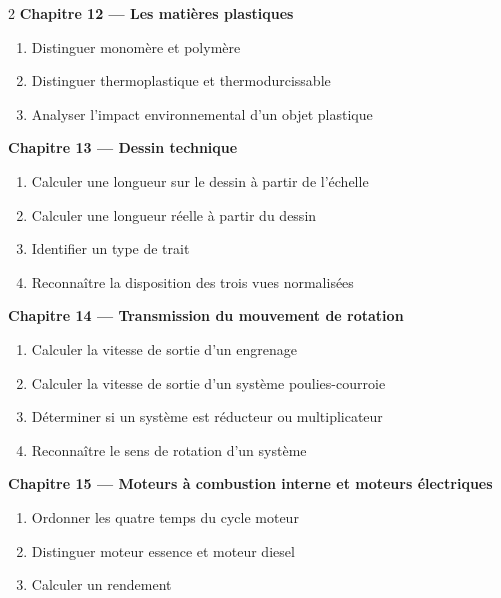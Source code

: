 \begin{multicols}{2}
\textbf{\normalsize\color{onbo}Chapitre 12 --- Les matières plastiques}
\begin{enumerate}[label=\arabic*.,itemsep=1pt,topsep=2pt,leftmargin=1.6em]
\item Distinguer monomère et polymère
\item Distinguer thermoplastique et thermodurcissable
\item Analyser l'impact environnemental d'un objet plastique
\end{enumerate}
\vspace{4pt}

\textbf{\normalsize\color{onbo}Chapitre 13 --- Dessin technique}
\begin{enumerate}[label=\arabic*.,itemsep=1pt,topsep=2pt,leftmargin=1.6em]
\item Calculer une longueur sur le dessin à partir de l'échelle
\item Calculer une longueur réelle à partir du dessin
\item Identifier un type de trait
\item Reconnaître la disposition des trois vues normalisées
\end{enumerate}
\vspace{4pt}

\textbf{\normalsize\color{onbo}Chapitre 14 --- Transmission du mouvement de rotation}
\begin{enumerate}[label=\arabic*.,itemsep=1pt,topsep=2pt,leftmargin=1.6em]
\item Calculer la vitesse de sortie d'un engrenage
\item Calculer la vitesse de sortie d'un système poulies-courroie
\item Déterminer si un système est réducteur ou multiplicateur
\item Reconnaître le sens de rotation d'un système
\end{enumerate}
\vspace{4pt}

\textbf{\normalsize\color{onbo}Chapitre 15 --- Moteurs à combustion interne et moteurs électriques}
\begin{enumerate}[label=\arabic*.,itemsep=1pt,topsep=2pt,leftmargin=1.6em]
\item Ordonner les quatre temps du cycle moteur
\item Distinguer moteur essence et moteur diesel
\item Calculer un rendement
\end{enumerate}
\vspace{4pt}


\end{multicols}
